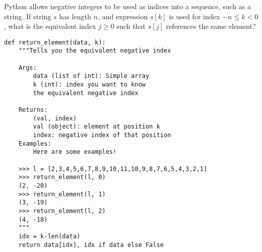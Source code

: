  \label{sssec:ex1_8}

Python allows negative integers to be used as indices into a sequence, such as a string. If string $s$ has length $n$, and expression $s[k]$ is used for index $-n\leq k<0$, what is the equivalent index $j\geq 0$ such that $s[j]$ references the same element?

\begin{lstlisting}[title=Exercise R-1.8]
def return_element(data, k):
    """Tells you the equivalent negative index

    Args:
        data (list of int): Simple array
        k (int): index you want to know
        the equivalent negative index

    Returns:
        (val, index)
        val (object): element at position k
        index: negative index of that position
    Examples:
        Here are some examples!

    >>> l = [2,3,4,5,6,7,8,9,10,11,10,9,8,7,6,5,4,3,2,1]
    >>> return_element(l, 0)
    (2, -20)
    >>> return_element(l, 1)
    (3, -19)
    >>> return_element(l, 2)
    (4, -18)
    """
    idx = k-len(data)
    return data[idx], idx if data else False
\end{lstlisting}